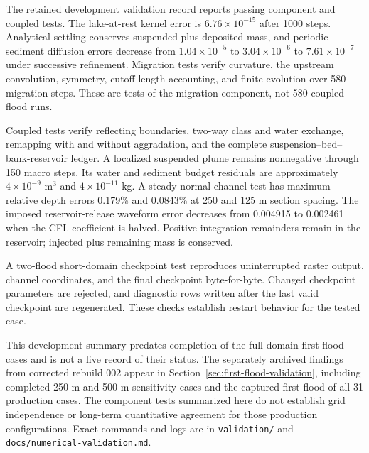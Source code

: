 The retained development validation record reports passing component and
coupled tests. The
lake-at-rest kernel error is $6.76\times10^{-15}$ after 1000 steps.
Analytical settling conserves suspended plus deposited mass, and periodic
sediment diffusion errors decrease from $1.04\times10^{-5}$ to
$3.04\times10^{-6}$ to $7.61\times10^{-7}$ under successive refinement.
Migration tests verify curvature, the upstream convolution, symmetry,
cutoff length accounting, and finite evolution over 580 migration steps.
These are tests of the migration component, not 580 coupled flood runs.

Coupled tests verify reflecting boundaries, two-way class and water
exchange, remapping with and without aggradation, and the complete
suspension--bed--bank-reservoir ledger. A localized suspended plume remains
nonnegative through 150 macro steps. Its water and sediment budget
residuals are approximately $4\times10^{-9}$ m$^3$ and
$4\times10^{-11}$ kg. A steady normal-channel test has maximum relative
depth errors 0.179\% and 0.0843\% at 250 and 125 m section spacing.
The imposed reservoir-release waveform error decreases from 0.004915
to 0.002461 when the CFL coefficient is halved. Positive integration
remainders remain in the reservoir; injected plus remaining mass is
conserved.

A two-flood short-domain checkpoint test reproduces uninterrupted raster
output, channel coordinates, and the final checkpoint byte-for-byte.
Changed checkpoint parameters are rejected, and diagnostic rows written
after the last valid checkpoint are regenerated. These checks establish
restart behavior for the tested case.

This development summary predates completion of the full-domain first-flood
cases and is not a live record of their status. The separately archived
findings from corrected rebuild 002 appear in
Section~\ref{sec:first-flood-validation}, including completed 250 m and 500 m
sensitivity cases and the captured first flood of all 31 production cases.
The component tests summarized here do not establish grid independence or
long-term quantitative agreement for those production configurations.
Exact commands and logs are in \texttt{validation/} and
\texttt{docs/numerical-validation.md}.
